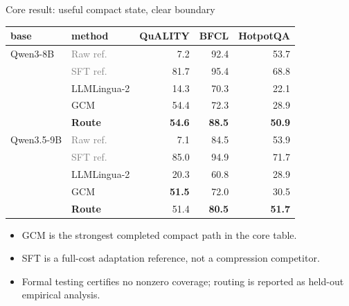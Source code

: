 \begin{frame}{Core result: useful compact state, clear boundary}
  \centering\scriptsize
  \begin{tabular}{llrrr}
  \toprule
  base & method & QuALITY & BFCL & HotpotQA \\
  \midrule
  Qwen3-8B & \textcolor{gray}{Raw ref.} & 7.2 & 92.4 & 53.7 \\
            & \textcolor{gray}{SFT ref.} & 81.7 & 95.4 & 68.8 \\
            & LLMLingua-2 & 14.3 & 70.3 & 22.1 \\
            & GCM & 54.4 & 72.3 & 28.9 \\
            & \textbf{Route} & \textbf{54.6} & \textbf{88.5} & \textbf{50.9} \\
  \midrule
  Qwen3.5-9B & \textcolor{gray}{Raw ref.} & 7.1 & 84.5 & 53.9 \\
              & \textcolor{gray}{SFT ref.} & 85.0 & 94.9 & 71.7 \\
              & LLMLingua-2 & 20.3 & 60.8 & 28.9 \\
              & GCM & \textbf{51.5} & 72.0 & 30.5 \\
              & \textbf{Route} & 51.4 & \textbf{80.5} & \textbf{51.7} \\
  \bottomrule
  \end{tabular}
  \vspace{0.45em}
  \begin{itemize}\footnotesize
    \item GCM is the strongest completed compact path in the core table.
    \item SFT is a full-cost adaptation reference, not a compression competitor.
    \item Formal testing certifies no nonzero coverage; routing is reported as held-out empirical analysis.
  \end{itemize}
\end{frame}

